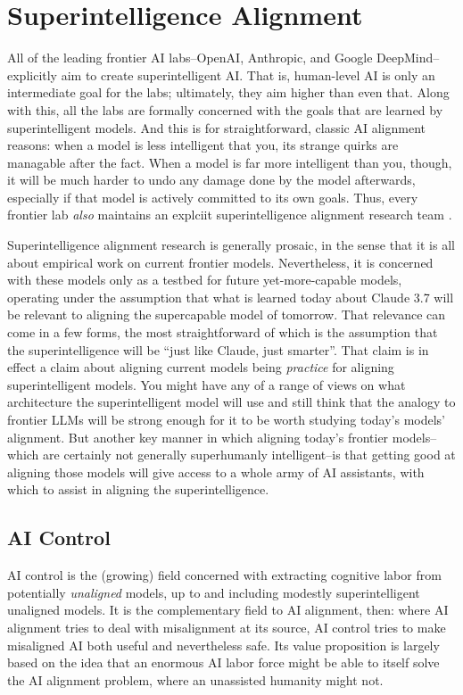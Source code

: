 \section{Superintelligence Alignment}
All of the leading frontier AI labs--OpenAI, Anthropic, and Google
DeepMind--explicitly aim to create superintelligent AI. That is, human-level AI
is only an intermediate goal for the labs; ultimately, they aim higher than
even that. Along with this, all the labs are formally concerned with the goals
that are learned by superintelligent models. And this is for straightforward,
classic AI alignment reasons: when a model is less intelligent that you, its
strange quirks are managable after the fact. When a model is far more
intelligent than you, though, it will be much harder to undo any damage done by
the model afterwards, especially if that model is actively committed to its own
goals. Thus, every frontier lab \emph{also} maintains an explciit
superintelligence alignment research team \cite{leike2023superalignment,
anthropic2025rsp}.

Superintelligence alignment research is generally prosaic, in the sense that it
is all about empirical work on current frontier models. Nevertheless, it is
concerned with these models only as a testbed for future yet-more-capable
models, operating under the assumption that what is learned today about Claude
3.7 will be relevant to aligning the supercapable model of tomorrow. That
relevance can come in a few forms, the most straightforward of which is the
assumption that the superintelligence will be ``just like Claude, just
smarter''. That claim is in effect a claim about aligning current models being
\emph{practice} for aligning superintelligent models. You might have any of a
range of views on what architecture the superintelligent model will use and
still think that the analogy to frontier LLMs will be strong enough for it to
be worth studying today's models' alignment. But another key manner in which
aligning today's frontier models--which are certainly not generally
superhumanly intelligent--is that getting good at aligning those models will
give access to a whole army of AI assistants, with which to assist in aligning
the superintelligence.

\subsection{AI Control}
AI control \cite{greenblatt2024aicontrol} is the (growing) field concerned with
extracting cognitive labor from potentially \emph{unaligned} models, up to and
including modestly superintelligent unaligned models. It is the complementary
field to AI alignment, then: where AI alignment tries to deal with misalignment
at its source, AI control tries to make misaligned AI both useful and
nevertheless safe. Its value proposition is largely based on the idea that an
enormous AI labor force might be able to itself solve the AI alignment problem,
where an unassisted humanity might not.

